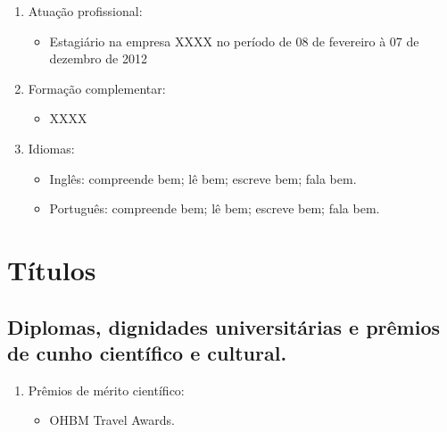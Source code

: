 \documentclass[a4paper,oneside,10pt]{article}
\newcounter{document}%
\begin{document}
{\begin{enumerate}
        \item Atuação profissional:
        \begin{itemize}
                \item Estagiário na empresa XXXX no período de 08 de fevereiro à 07 de dezembro de 2012 %
        \end{itemize}

        \item Formação complementar:
        \begin{itemize}
                \item XXXX \\
        \end{itemize}

        \item Idiomas:
        \begin{itemize}
                \item Inglês: compreende bem; lê bem; escreve bem; fala bem.
                \item Português: compreende bem; lê bem; escreve bem; fala bem.
        \end{itemize}
\end{enumerate}}

\newpage
\section{Títulos}
\subsection{Diplomas, dignidades universitárias e prêmios de cunho científico e cultural.}
\large{
\begin{enumerate}
        \item Prêmios de mérito científico:
        \begin{itemize}
                \item OHBM Travel Awards. \mbox{} \\
        \end{itemize}
\end{enumerate}}

\end{document}
